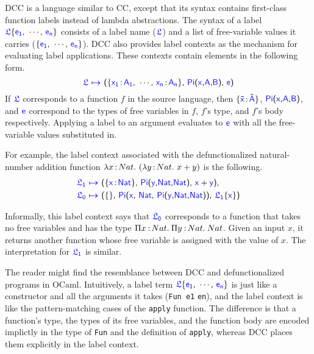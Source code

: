 DCC is a language similar to CC, except that its syntax contains first-class function labels instead of lambda abstractions. The syntax of a label $\target{\flabel}\{\target{e_1} \sfcomma \cdots \sfcomma \target{e_n}\}$ consists of a label name ($\target{\flabel}$) and a list of free-variable values it carries ($\{\target{e_1} \sfcomma \cdots \sfcomma \target{e_n}\}$). DCC also provides label contexts as the mechanism for evaluating label applications. These contexts contain elements in the following form.
\begin{equation*}
	\itemdef{\target{\flabel}}{\itemtype{x_1}{A_1} \sfcomma \cdots \sfcomma \itemtype{x_n}{A_n}}{\targetpi{x}{A}{B}}{\target{e}}
\end{equation*}
If $\target{\flabel}$ corresponds to a function $f$ in the source language, then $\{\itemtype{\bar{x}}{\bar{A}}\}$, $\targetpi{x}{A}{B}$, and $\target{e}$ correspond to the types of free variables in $f$, $f$'s type, and $f$'s body respectively. Applying a label to an argument evaluates to $\target{e}$ with all the free-variable values substituted in.

For example, the label context associated with the defunctionalized natural-number addition function 
$\lambda x\hspace{0.5mm}{:}\hspace{0.5mm} Nat.\ (\lambda y\hspace{0.5mm}{:}\hspace{0.5mm} Nat.\ x + y)$ is the following.
\begin{align*}
	&\itemdef{\target{\flabel_1}}{\itemtype{\target{x}}{Nat}}{\targetpi{y}{Nat}{Nat}}{\target{x} + \target{y}}\sfcomma\\
	& \itemdef{\target{\flabel_0}}{}
	{\target{Pi}\textsf{(}\target{x}\sfcomma \target{Nat}\sfcomma \targetpi{y}{Nat}{Nat}\textsf{)}}
	{\targetlab{\flabel_1}{x}}
\end{align*}

Informally, this label context says that $\target{\flabel_0}$ corresponds to a function that takes no free variables and has the type $\Pi x\mkern1.5mu{\hspace{0.5mm}{:}\hspace{0.5mm}} Nat.\hspace{0.8mm}\Pi y\mkern1.5mu{\hspace{0.5mm}{:}\hspace{0.5mm}} Nat.\hspace{0.8mm}Nat$. Given an input $x$, it returns another function whose free variable is assigned with the value of $x$. The interpretation for $\target{\flabel_1}$ is similar.

The reader might find the resemblance between DCC and defunctionalized programs in OCaml. Intuitively, a label term $\target{\flabel}\{\target{e_1} \sfcomma \cdots \sfcomma \target{e_n}\}$ is just like a constructor and all the arguments it takes (\texttt{Fun e1} \codemath{\cdots} \texttt{en}), and the label context is like the pattern-matching cases of the \texttt{apply} function. The difference is that a function's type, the types of its free variables, and the function body are encoded implictly in the type of \texttt{Fun} and the definition of \texttt{apply}, whereas DCC places them explicitly in the label context. 




